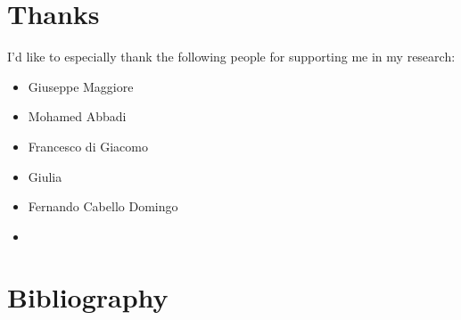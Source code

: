\documentclass{article}
\begin{document}
\section{Thanks}
I'd like to especially thank the following people for supporting me in my research:
\begin{itemize}
\item{Giuseppe Maggiore}
\item{Mohamed Abbadi}
\item{Francesco di Giacomo}
\item{Giulia }
\item{Fernando Cabello Domingo}
\item{}
\end{itemize}

\section{Bibliography}


\fi
\end{document}
